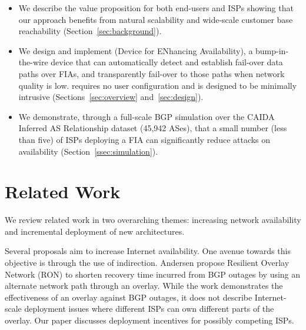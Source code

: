 \begin{itemize}
\setlength{\itemsep}{-3pt}
	
	\item We describe the value proposition for both end-users and ISPs showing
that our approach benefits from natural scalability and wide-scale customer
base reachability (Section~\ref{sec:background}).

    \item We design and implement \name (Device for ENhancing Availability), a
bump-in-the-wire device that can automatically detect and establish fail-over
data paths over FIAs, and transparently fail-over to those paths when network
quality is low. \name requires no user configuration and is designed to be
minimally intrusive (Sections~\ref{sec:overview} and~\ref{sec:design}).

    \item We demonstrate, through a full-scale BGP simulation over the CAIDA
Inferred AS Relationship dataset (45,942 ASes), that a small number (less than
five) of ISPs deploying a FIA can significantly reduce attacks on availability
(Section~\ref{ssec:simulation}).

\end{itemize}

\section{Related Work}
\label{sec:related}
We review related work in two overarching themes: increasing network
availability and incremental deployment of new architectures. 

Several proposals aim to increase Internet availability. One avenue towards
this objective is through the use of indirection. Andersen \etal\cite{RON2001}
propose Resilient Overlay Network (RON) to shorten recovery time incurred from
BGP outages by using an alternate network path through an overlay. While the
work demonstrates the effectiveness of an overlay against BGP outages, it does
not describe Internet-scale deployment issues where different ISPs can own
different parts of the overlay. Our paper discusses deployment incentives for
possibly competing ISPs. 

